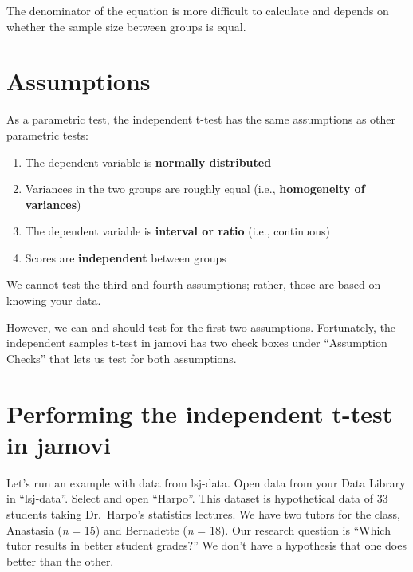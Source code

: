 \documentclass[
]{book}
\begin{document}
The denominator of the equation is more difficult to calculate and depends on whether the sample size between groups is equal.

\hypertarget{assumptions}{%
\section{Assumptions}\label{assumptions}}

As a parametric test, the independent t-test has the same assumptions as other parametric tests:

\begin{enumerate}
\def\labelenumi{\arabic{enumi}.}
\item
  The dependent variable is \textbf{normally distributed}
\item
  Variances in the two groups are roughly equal (i.e., \textbf{homogeneity of variances})
\item
  The dependent variable is \textbf{interval or ratio} (i.e., continuous)
\item
  Scores are \textbf{independent} between groups
\end{enumerate}

We cannot \underline{test} the third and fourth assumptions; rather, those are based on knowing your data.

However, we can and should test for the first two assumptions. Fortunately, the independent samples t-test in jamovi has two check boxes under ``Assumption Checks'' that lets us test for both assumptions.

\hypertarget{performing-the-independent-t-test-in-jamovi}{%
\section{Performing the independent t-test in jamovi}\label{performing-the-independent-t-test-in-jamovi}}

Let's run an example with data from lsj-data. Open data from your Data Library in ``lsj-data''. Select and open ``Harpo''. This dataset is hypothetical data of 33 students taking Dr.~Harpo's statistics lectures. We have two tutors for the class, Anastasia (\emph{n} = 15) and Bernadette (\emph{n} = 18). Our research question is ``Which tutor results in better student grades?'' We don't have a hypothesis that one does better than the other.
\end{document}
